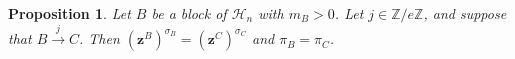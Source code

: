 \documentclass[11pt,a4paper,reqno]{amsart}
\numberwithin{equation}{section}
\theoremstyle{plain}
\newtheorem{prop}[thm]{Proposition}
\theoremstyle{definition}
\theoremstyle{remark}
\numberwithin{equation}{section}
\newcommand{\bbone}{\mathbbm{1}}
\newcommand{\br}{\mathbf{r}}
\newcommand{\bz}{\mathbf{z}}
\newcommand{\ZZ}{\mathbb{Z}}
\newcommand{\cs}{\mathsf{s}}
\newcommand{\HH}{\mathcal{H}}
\newcommand{\DDot}[1]{\mathrel{\overset{#1}{\bullet}}}
\newcommand{\Ht}{\mathsf{ht}}
\newcommand{\II}{\mathcal{I}}
\newcommand{\dd}{\mathsf{d}}
\begin{document}

\begin{prop} \label{P:same-residue-pyramid}
Let $B$ be a block of $\HH_n$ with $m_B > 0$. Let $j \in \ZZ/e\ZZ$, and 
suppose that $B \xrightarrow{j} C$.
Then
$(\bz^B)^{\sigma_B} = (\bz^C)^{\sigma_C}$ and $\pi_B = \pi_C$.
\end{prop}
\end{document}
